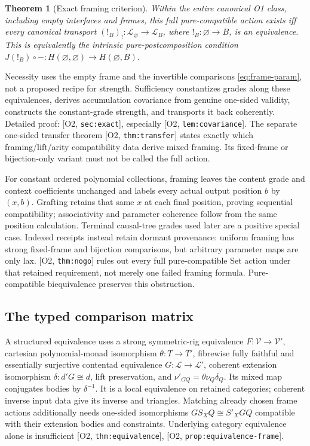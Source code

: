 \documentclass[11pt,a4paper]{article}
\newtheorem{theorem}{Theorem}[section]
\theoremstyle{definition}
\newcommand{\V}{\mathcal V}
\newcommand{\Lc}{\mathcal L}
\newcommand{\Addr}[2]{\textup{[#1, \texttt{#2}]}}
\begin{document}
\begin{theorem}[Exact framing criterion]\label{thm:action}
Within the entire canonical O1 class, including empty interfaces and
frames, this full pure-compatible action exists iff every canonical
transport \((!_B)_!:\Lc_\varnothing\to\Lc_B\), where
\(!_B:\varnothing\to B\), is an equivalence. This is equivalently the
intrinsic pure-postcomposition condition
\(J(!_B)\circ-:H(\varnothing,\varnothing)\to H(\varnothing,B)\).
\end{theorem}
Necessity uses the empty frame and the invertible comparisons
\eqref{eq:frame-param}, not a proposed recipe for strength. Sufficiency
constantizes grades along these equivalences, derives accumulation
covariance from genuine one-sided validity, constructs the constant-grade
strength, and transports it back coherently. Detailed proof:
\Addr{O2}{sec:exact}, especially \Addr{O2}{lem:covariance}.
The separate one-sided transfer theorem \Addr{O2}{thm:transfer} states
exactly which framing/lift/arity compatibility data derive mixed framing.
Its fixed-frame or bijection-only variant must not be called the full action.

For constant ordered polynomial collections, framing leaves the content
grade and context coefficients unchanged and labels every actual output
position \(b\) by \((x,b)\). Grafting retains that same \(x\) at
each final position, proving sequential compatibility; associativity and
parameter coherence follow from the same position calculation. Terminal
causal-tree grades used later are a positive special case. Indexed
receipts instead retain dormant provenance: uniform framing has strong
fixed-frame and bijection comparisons, but arbitrary parameter maps are
only lax. \Addr{O2}{thm:nogo} rules out every full pure-compatible Set
action under that retained requirement, not merely one failed framing
formula. Pure-compatible biequivalence preserves this obstruction.

\subsection{The typed comparison matrix}
A structured equivalence uses a strong symmetric-rig equivalence
\(F:\V\to\V'\), cartesian polynomial-monad isomorphism
\(\theta:T\to T'\), fibrewise fully faithful and essentially surjective
contentad equivalence \(G:\Lc\to\Lc'\), coherent extension isomorphism
\(\delta:d'G\cong d\), lift preservation, and
\(\nu'_{GQ}=\theta\nu_Q\delta_Q\). Its mixed map conjugates bodies
by \(\delta^{-1}\). It is a local equivalence on retained categories;
coherent inverse input data give its inverse and triangles. Matching
already chosen frame actions additionally needs one-sided isomorphisms
\(GS_XQ\cong S'_XGQ\) compatible with their extension bodies and
constraints. Underlying category equivalence alone is insufficient
\Addr{O2}{thm:equivalence}, \Addr{O2}{prop:equivalence-frame}.
\end{document}
